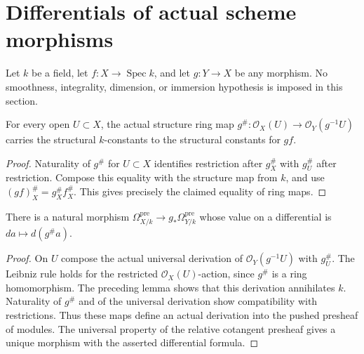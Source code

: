 \section{Differentials of actual scheme morphisms}

Let $k$ be a field, let $f:X\to\operatorname{Spec}k$, and let $g:Y\to X$ be any morphism. No smoothness, integrality, dimension, or immersion hypothesis is imposed in this section.

\begin{lemma}\label{sc0-cotangent-morphism:constants}
\leanok
For every open $U\subset X$, the actual structure ring map $g^\#: \mathcal O_X(U)\to\mathcal O_Y(g^{-1}U)$ carries the structural $k$-constants to the structural constants for $g f$.
\end{lemma}
\begin{proof}
Naturality of $g^\#$ for $U\subset X$ identifies restriction after $g^\#_X$ with $g^\#_U$ after restriction. Compose this equality with the structure map from $k$, and use $(gf)^\#_X=g^\#_X f^\#_X$. This gives precisely the claimed equality of ring maps.
\end{proof}

\begin{definition}\label{sc0-cotangent-morphism:raw}
\leanok
{}
There is a natural morphism $\Omega^{\mathrm{pre}}_{X/k}\to g_*\Omega^{\mathrm{pre}}_{Y/k}$ whose value on a differential is $da\mapsto d(g^\#a)$.
\end{definition}
\begin{proof}
On $U$ compose the actual universal derivation of $\mathcal O_Y(g^{-1}U)$ with $g^\#_U$. The Leibniz rule holds for the restricted $\mathcal O_X(U)$-action, since $g^\#$ is a ring homomorphism. The preceding lemma shows that this derivation annihilates $k$. Naturality of $g^\#$ and of the universal derivation show compatibility with restrictions. Thus these maps define an actual derivation into the pushed presheaf of modules. The universal property of the relative cotangent presheaf gives a unique morphism with the asserted differential formula.
\end{proof}

